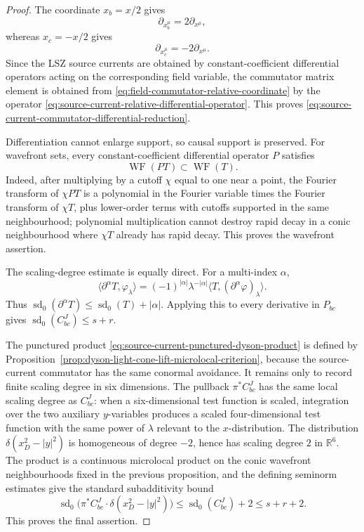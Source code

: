\begin{proof}
The coordinate \(x_b=x/2\) gives
\[
  \partial_{x_b^\mu}=2\partial_{x^\mu},
\]
whereas \(x_c=-x/2\) gives
\[
  \partial_{x_c^\mu}=-2\partial_{x^\mu}.
\]
Since the LSZ source currents are obtained by constant-coefficient
differential operators acting on the corresponding field variable, the
commutator matrix element is obtained from
\eqref{eq:field-commutator-relative-coordinate} by the operator
\eqref{eq:source-current-relative-differential-operator}.  This proves
\eqref{eq:source-current-commutator-differential-reduction}.

Differentiation cannot enlarge support, so causal support is preserved.
For wavefront sets, every constant-coefficient differential operator \(P\)
satisfies
\begin{equation}
  \operatorname{WF}(PT)\subset\operatorname{WF}(T).
  \label{eq:differential-wavefront-inclusion}
\end{equation}
Indeed, after multiplying by a cutoff \(\chi\) equal to one near a point, the
Fourier transform of \(\chi PT\) is a polynomial in the Fourier variable
times the Fourier transform of \(\chi T\), plus lower-order terms with
cutoffs supported in the same neighbourhood; polynomial multiplication cannot
destroy rapid decay in a conic neighbourhood where \(\chi T\) already has
rapid decay.  This proves the wavefront assertion.

The scaling-degree estimate is equally direct.  For a multi-index \(\alpha\),
\begin{equation}
  \langle\partial^\alpha T,\varphi_\lambda\rangle
  =
  (-1)^{|\alpha|}
  \lambda^{-|\alpha|}
  \langle T,(\partial^\alpha\varphi)_\lambda\rangle .
  \label{eq:scaling-degree-derivative-shift}
\end{equation}
Thus \(\operatorname{sd}_0(\partial^\alpha T)\le
\operatorname{sd}_0(T)+|\alpha|\).  Applying this to every derivative in
\(P_{bc}\) gives \(\operatorname{sd}_0(C^J_{bc})\le s+r\).

The punctured product
\eqref{eq:source-current-punctured-dyson-product} is defined by
Proposition~\ref{prop:dyson-light-cone-lift-microlocal-criterion}, because
the source-current commutator has the same conormal avoidance.  It remains
only to record finite scaling degree in six dimensions.  The pullback
\(\pi^*C^J_{bc}\) has the same local scaling degree as \(C^J_{bc}\): when a
six-dimensional test function is scaled, integration over the two auxiliary
\(y\)-variables produces a scaled four-dimensional test function with the
same power of \(\lambda\) relevant to the \(x\)-distribution.  The
distribution \(\delta(x_D^2-|y|^2)\) is homogeneous of degree \(-2\), hence
has scaling degree \(2\) in \(\mathbb R^6\).  The product is a continuous
microlocal product on the conic wavefront neighbourhoods fixed in the
previous proposition, and the defining seminorm estimates give the standard
subadditivity bound
\begin{equation}
  \operatorname{sd}_0
  \bigl(\pi^*C^J_{bc}\cdot\delta(x_D^2-|y|^2)\bigr)
  \le
  \operatorname{sd}_0(C^J_{bc})+2
  \le s+r+2.
  \label{eq:source-current-lift-scaling-bound}
\end{equation}
This proves the final assertion.
\end{proof}

